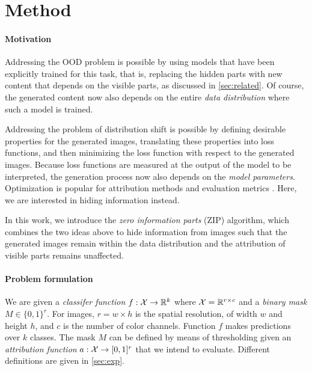 \section{Method}
\label{sec:method}

\paragraph{Motivation}

Addressing the OOD problem is possible by using models that have been explicitly trained for this task, that is, replacing the hidden parts with new content that depends on the visible parts, as discussed in \autoref{sec:related}. Of course, the generated content now also depends on the entire \emph{data distribution} where such a model is trained.

Addressing the problem of distribution shift is possible by defining desirable properties for the generated images, translating these properties into loss functions, and then minimizing the loss function with respect to the generated images. Because loss functions are measured at the output of the model to be interpreted, the generation process now also depends on the \emph{model parameters}. Optimization is popular for attribution methods \citep{zhang2023opticam, schulz2020restricting} and evaluation metrics \citep{khakzar2022explanations, poppi2021revisiting}. Here, we are interested in hiding information instead.

In this work, we introduce the \emph{zero information parts} (ZIP) algorithm, which combines the two ideas above to hide information from images such that the generated images remain within the data distribution and the attribution of visible parts remains unaffected.


\paragraph{Problem formulation}

We are given a \emph{classifer function} $f : \mathcal{X} \to \mathbb{R}^k$ where $\mathcal{X} = \mathbb{R}^{r \times c}$ and a \emph{binary mask} $M \in \{0,1\}^r$. For images, $r = w \times h$ is the spatial resolution, of width $w$ and height $h$, and $c$ is the number of color channels. Function $f$ makes predictions over $k$ classes. The mask $M$ can be defined by means of thresholding given an \emph{attribution function} $a: \mathcal{X} \to [0,1]^r$ that we intend to evaluate. Different definitions are given in \autoref{sec:exp}.

